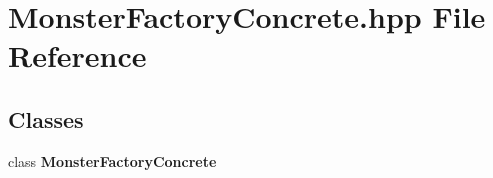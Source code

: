 \section{Monster\-Factory\-Concrete.\-hpp File Reference}
\label{_monster_factory_concrete_8hpp}
\subsection*{Classes}
\begin{DoxyCompactItemize}
\item 
class {\bf Monster\-Factory\-Concrete}
\end{DoxyCompactItemize}
